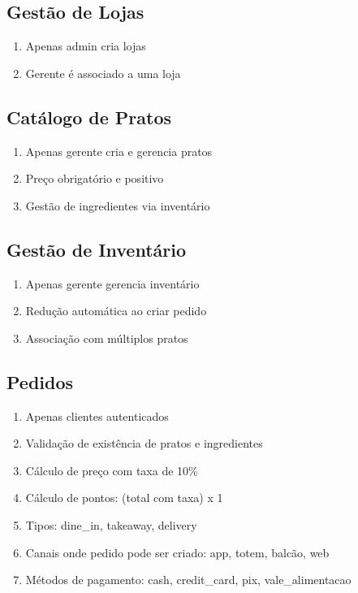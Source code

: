 \subsection{Gestão de Lojas}
\label{subsec:store}

\begin{enumerate}[topsep=1pt, itemsep=0pt]
  \item Apenas admin cria lojas
  \item Gerente é associado a uma loja
\end{enumerate}

\subsection{Catálogo de Pratos}
\label{subsec:catalogue}

\begin{enumerate}[topsep=1pt, itemsep=0pt]
  \item Apenas gerente cria e gerencia pratos
  \item Preço obrigatório e positivo
  \item Gestão de ingredientes via inventário
\end{enumerate}

\subsection{Gestão de Inventário}
\label{subsec:inventory}

\begin{enumerate}[topsep=1pt, itemsep=0pt]
  \item Apenas gerente gerencia inventário
  \item Redução automática ao criar pedido
  \item Associação com múltiplos pratos
\end{enumerate}

\subsection{Pedidos}
\label{subsec:order}

\begin{enumerate}[topsep=1pt, itemsep=0pt]
  \item Apenas clientes autenticados
  \item Validação de existência de pratos e ingredientes
  \item Cálculo de preço com taxa de 10\%
  \item Cálculo de pontos: (total com taxa) x 1
  \item Tipos: dine\_in, takeaway, delivery
  \item Canais onde pedido pode ser criado: app, totem, balcão, web
  \item Métodos de pagamento: cash, credit\_card, pix, vale\_alimentacao
\end{enumerate}

